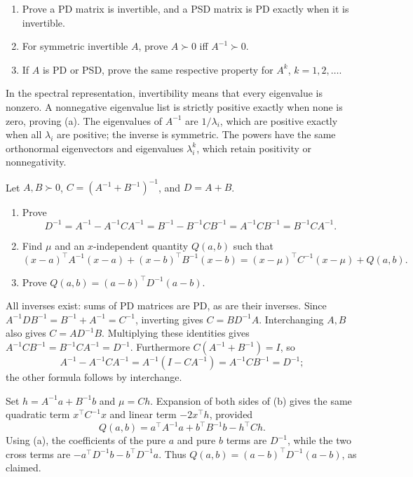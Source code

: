 \begin{problem}\label{ex:09:inverse-powers}
\begin{enumerate}
\item Prove a PD matrix is invertible, and a PSD matrix is PD exactly
when it is invertible.
\item For symmetric invertible \(A\), prove \(A\succ0\) iff \(A^{-1}\succ0\).
\item If \(A\) is PD or PSD, prove the same respective property for
\(A^k\), \(k=1,2,\ldots\).
\end{enumerate}
\end{problem}
\begin{solution}
In the spectral representation, invertibility means that every eigenvalue
is nonzero. A nonnegative eigenvalue list is strictly positive exactly
when none is zero, proving (a).
The eigenvalues of \(A^{-1}\) are \(1/\lambda_i\), which are positive
exactly when all \(\lambda_i\) are positive; the inverse is symmetric.
The powers have the same orthonormal eigenvectors and eigenvalues
\(\lambda_i^k\), which retain positivity or nonnegativity.
\end{solution}

\begin{problem}\label{ex:09:complete-square}
Let \(A,B\succ0\), \(C=(A^{-1}+B^{-1})^{-1}\), and \(D=A+B\).
\begin{enumerate}
\item Prove
\[
 D^{-1}=A^{-1}-A^{-1}CA^{-1}
 =B^{-1}-B^{-1}CB^{-1}
 =A^{-1}CB^{-1}=B^{-1}CA^{-1}.
\]
\item Find \(\mu\) and an \(x\)-independent quantity \(Q(a,b)\) such that
\[
 (x-a)^\top A^{-1}(x-a)+(x-b)^\top B^{-1}(x-b)
 =(x-\mu)^\top C^{-1}(x-\mu)+Q(a,b).
\]
\item Prove \(Q(a,b)=(a-b)^\top D^{-1}(a-b)\).
\end{enumerate}
\end{problem}
\begin{solution}
All inverses exist: sums of PD matrices are PD, as are their inverses.
Since \(A^{-1}DB^{-1}=B^{-1}+A^{-1}=C^{-1}\),
inverting gives \(C=BD^{-1}A\).
Interchanging \(A,B\) also gives \(C=AD^{-1}B\).
Multiplying these identities gives
\(A^{-1}CB^{-1}=B^{-1}CA^{-1}=D^{-1}\).
Furthermore \(C(A^{-1}+B^{-1})=I\), so
\[
 A^{-1}-A^{-1}CA^{-1}
 =A^{-1}(I-CA^{-1})=A^{-1}CB^{-1}=D^{-1};
\]
the other formula follows by interchange.

Set \(h=A^{-1}a+B^{-1}b\) and \(\mu=Ch\).
Expansion of both sides of (b) gives the same quadratic term
\(x^\top C^{-1}x\) and linear term \(-2x^\top h\), provided
\[
 Q(a,b)=a^\top A^{-1}a+b^\top B^{-1}b-h^\top Ch.
\]
Using (a), the coefficients of the pure \(a\) and pure \(b\) terms
are \(D^{-1}\), while the two cross terms are
\(-a^\top D^{-1}b-b^\top D^{-1}a\).
Thus \(Q(a,b)=(a-b)^\top D^{-1}(a-b)\), as claimed.
\end{solution}

